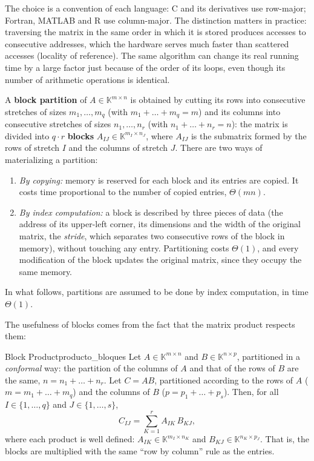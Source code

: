 \documentclass[11pt, a4paper]{article}
\begin{document}
\obs The choice is a convention of each language: C and its derivatives use row-major; Fortran, MATLAB and R use column-major. The distinction matters in practice: traversing the matrix in the same order in which it is stored produces accesses to consecutive addresses, which the hardware serves much faster than scattered accesses (locality of reference). The same algorithm can change its real running time by a large factor just because of the order of its loops, even though its number of arithmetic operations is identical.

A \textbf{block partition} of $A \in \mathbb{K}^{m \times n}$ is obtained by cutting its rows into consecutive stretches of sizes $m_1, \dots, m_q$ (with $m_1 + \dots + m_q = m$) and its columns into consecutive stretches of sizes $n_1, \dots, n_r$ (with $n_1 + \dots + n_r = n$): the matrix is divided into $q \cdot r$ \textbf{blocks} $A_{IJ} \in \mathbb{K}^{m_I \times n_J}$, where $A_{IJ}$ is the submatrix formed by the rows of stretch $I$ and the columns of stretch $J$. There are two ways of materializing a partition:
\begin{enumerate}
    \item \textit{By copying:} memory is reserved for each block and its entries are copied. It costs time proportional to the number of copied entries, $\Theta(mn)$.
    \item \textit{By index computation:} a block is described by three pieces of data (the address of its upper-left corner, its dimensions and the width of the original matrix, the \emph{stride}, which separates two consecutive rows of the block in memory), without touching any entry. Partitioning costs $\Theta(1)$, and every modification of the block updates the original matrix, since they occupy the same memory.
\end{enumerate}
In what follows, partitions are assumed to be done by index computation, in time $\Theta(1)$.

The usefulness of blocks comes from the fact that the matrix product respects them:

\begin{proposicion}{Block Product}{producto_bloques}
Let $A \in \mathbb{K}^{m \times n}$ and $B \in \mathbb{K}^{n \times p}$, partitioned in a \emph{conformal} way: the partition of the columns of $A$ and that of the rows of $B$ are the same, $n = n_1 + \dots + n_r$. Let $C = AB$, partitioned according to the rows of $A$ ($m = m_1 + \dots + m_q$) and the columns of $B$ ($p = p_1 + \dots + p_s$). Then, for all $I \in \{1, \dots, q\}$ and $J \in \{1, \dots, s\}$,
\[
C_{IJ} = \sum_{K=1}^{r} A_{IK} \, B_{KJ},
\]
where each product is well defined: $A_{IK} \in \mathbb{K}^{m_I \times n_K}$ and $B_{KJ} \in \mathbb{K}^{n_K \times p_J}$. That is, the blocks are multiplied with the same ``row by column'' rule as the entries.
\end{proposicion}
\end{document}
